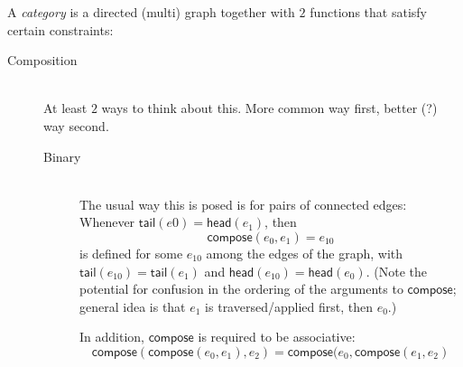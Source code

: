 \documentclass[11pt,openany]{article}
\begin{document}
A \textit{category} is a directed (multi) graph 
together with $2$ functions that satisfy certain constraints:
\begin{description}
\item[Composition]\mbox{}\\
At least $2$ ways to think about this. 
More common way first, better (?) way second.
\begin{description}
\item[Binary]\mbox{}\\
The usual way this is posed is for pairs of connected edges:
Whenever $\mathsf{tail}(e0) = \mathsf{head}(e_1)$,
then
\[ \mathsf{compose}(e_0,e_1) = e_{10} \]
is defined
for some $e_{10}$ among the edges of the graph,
with $\mathsf{tail}(e_{10}) = \mathsf{tail}(e_1)$
and $\mathsf{head}(e_{10}) = \mathsf{head}(e_0)$.
(Note the potential for confusion 
in the ordering of the arguments to $\mathsf{compose}$;
general idea is that $e_1$ is traversed/applied first,
then $e_0$.)
\par
In addition, $\mathsf{compose}$ is required to be associative:
\[
\mathsf{compose}(\mathsf{compose}(e_0,e_1),e_2) 
= \mathsf{compose}(e_0,\mathsf{compose}(e_1,e_2)
\]


\end{description}
\end{description}
\end{document}
